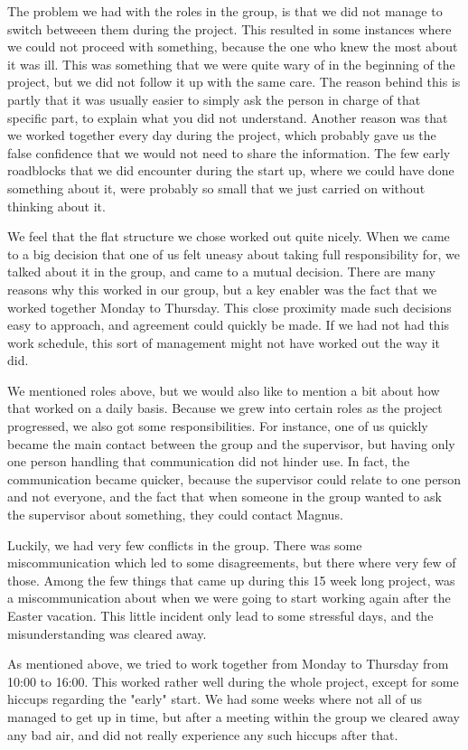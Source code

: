 The problem we had with the roles in the group, is that we did not manage to switch betweeen them during the project. This resulted in some instances where we could not proceed with something, because the one who knew the most about it was ill. This was something that we were quite wary of in the beginning of the project, but we did not follow it up with the same care. The reason behind this is partly that it was usually easier to simply ask the person in charge of that specific part, to explain what you did not understand. Another reason was that we worked together every day during the project, which probably gave us the false confidence that we would not need to share the information. The few early roadblocks that we did encounter during the start up, where we could have done something about it, were probably so small that we just carried on without thinking about it.

We feel that the flat structure we chose worked out quite nicely. When we came to a big decision that one of us felt uneasy about taking full responsibility for, we talked about it in the group, and came to a mutual decision. There are many reasons why this worked in our group, but a key enabler was the fact that we worked together Monday to Thursday. This close proximity made such decisions easy to approach, and agreement could quickly be made. If we had not had this work schedule, this sort of management might not have worked out the way it did.

We mentioned roles above, but we would also like to mention a bit about how that worked on a daily basis. Because we grew into certain roles as the project progressed, we also got some responsibilities. For instance, one of us quickly became the main contact between the group and the supervisor, but having only one person handling that communication did not hinder use. In fact, the communication became quicker, because the supervisor could relate to one person and not everyone, and the fact that when someone in the group wanted to ask the supervisor about something, they could contact Magnus.

Luckily, we had very few conflicts in the group. There was some miscommunication which led to some disagreements, but there where very few of those. Among the few things that came up during this 15 week long project, was a miscommunication about when we were going to start working again after the Easter vacation. This little incident only lead to some stressful days, and the misunderstanding was cleared away.

As mentioned above, we tried to work together from Monday to Thursday from 10:00 to 16:00. This worked rather well during the whole project, except for some hiccups regarding the "early" start. We had some weeks where not all of us managed to get up in time, but after a meeting within the group we cleared away any bad air, and did not really experience any such hiccups after that.
